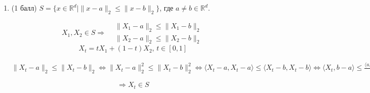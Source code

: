 \documentclass[a5paper,twoside,russian]{article}
\begin{document}
\begin{enumerate}[label=\textbf{Задача \arabic*.}]
\begin{enumerate}
\begin{prf}
            $x_t^i = tx_1^i + (1-t)x_2^i$
            
            \begin{enumerate}
                \item $i > 0$
                
                    $tx_1^t + (1-t)x_2^i \geq tx_1^{i+i} + (1-t)x_2^{i-1} = x_t^{i-1}$

                \item $i < d$
                
                    $tx_1^t + (1-t)x_2^i \leq tx_1^{i+1} + (1-t)x_2^{i+1} = x_t^{i+1}$
            \end{enumerate}
            
            \[
            \begin{aligned}
                \Rightarrow x_t^1 \leq ... x_t^d \Rightarrow X_t \in S
            \end{aligned}
            \]
        \end{prf}


        \item (1 балл) $S = \{ x \in \mathbb{R}^d \mid  \| x - a\|_2 \leq \| x - b\|_2 \}$, где $a\neq b \in \mathbb{R}^d$.
        
        \begin{prf}
            \[
            X_1, X_2 \in S \Rightarrow
            \begin{aligned}
                &\| X_1 - a \|_2 \leq \| X_1 - b \|_2 \\
                &\| X_2 - a \|_2 \leq \| X_2 - b \|_2
            \end{aligned}
            \]
            \[
            X_t = tX_1 + (1-t)X_2, \, t \in [0, 1]
            \]

            $\| X_t - a\|_2 \leq \| X_t - b\|_2 \Leftrightarrow \| X_t - a\|_2^2 \leq \| X_t - b\|_2^2 \Leftrightarrow 
            \langle X_t-a, X_t-a \rangle \leq \langle X_t-b, X_t-b \rangle \Leftrightarrow 
            \langle X_t, b-a \rangle \leq \frac{\langle a, a \rangle + \langle b, b \rangle}{2} \Leftrightarrow 
            \left\langle tX_1 + (1-t) X_2, b-a \right\rangle \leq \frac{\|a\|_2^2 + \| b\|_2^2}{2} \Leftrightarrow
            t \langle X_1, b-a \rangle + (1-t) \langle X_2, b-a \rangle \leq \frac{\|a\|_2^2 + \| b\|_2^2}{2} \Leftrightarrow
            t \frac{\|a\|_2^2 + \| b\|_2^2}{2} + (1-t) \frac{\|a\|_2^2 + \| b\|_2^2}{2} \leq \frac{\|a\|_2^2 + \| b\|_2^2}{2} \Rightarrow$
            
            \[
            \begin{aligned}
                \Rightarrow X_t \in S
            \end{aligned}
            \]
        

\end{prf}
\end{enumerate}
\end{enumerate}
\end{document}

